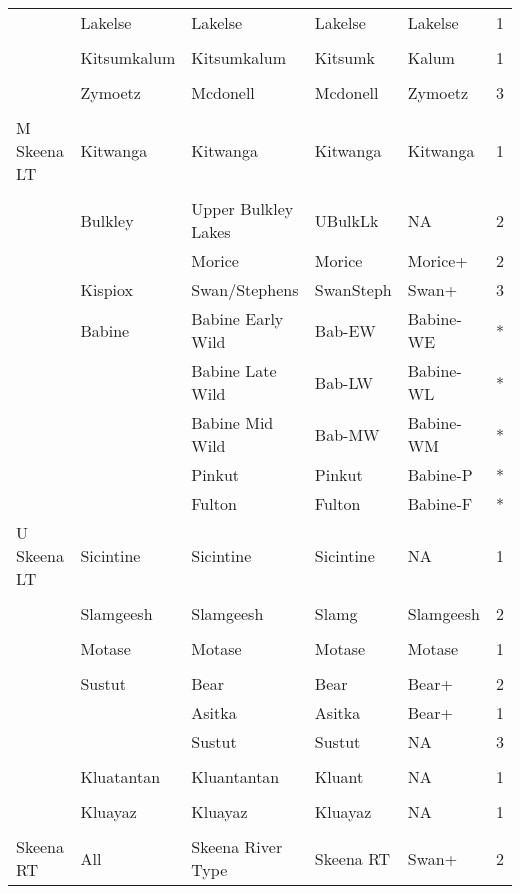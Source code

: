 \documentclass[french,11pt]{book}
\begin{document}
\begin{longtable}[t]{lllllr}
\cmidrule(l){2-6}\\  & Lakelse & Lakelse & Lakelse & Lakelse & 1\\
\cmidrule(l){2-6}\\  & Kitsumkalum & Kitsumkalum & Kitsumk & Kalum & 1\\
\cmidrule(l){2-6}\\  & Zymoetz & Mcdonell & Mcdonell & Zymoetz & 3\\
\midrule\\ M Skeena LT & Kitwanga & Kitwanga & Kitwanga & Kitwanga & 1\\
\cmidrule(l){2-6}\\  & Bulkley & Upper Bulkley Lakes & UBulkLk & NA & 2\\  &  & Morice & Morice & Morice+ & 2\\
\cmidrule(l){2-6}  & Kispiox & Swan/Stephens & SwanSteph & Swan+ & 3\\
\cmidrule(l){2-6}  & Babine & Babine Early Wild & Bab-EW & Babine-WE & *\\  &  & Babine Late Wild & Bab-LW & Babine-WL & *\\  &  & Babine Mid Wild & Bab-MW & Babine-WM & *\\  &  & Pinkut & Pinkut & Babine-P & *\\  &  & Fulton & Fulton & Babine-F & *\\
\midrule U Skeena LT & Sicintine & Sicintine & Sicintine & NA & 1\\
\cmidrule(l){2-6}\\  & Slamgeesh & Slamgeesh & Slamg & Slamgeesh & 2\\
\cmidrule(l){2-6}\\  & Motase & Motase & Motase & Motase & 1\\
\cmidrule(l){2-6}\\  & Sustut & Bear & Bear & Bear+ & 2\\  &  & Asitka & Asitka & Bear+ & 1\\  &  & Sustut & Sustut & NA & 3\\
\cmidrule(l){2-6}\\  & Kluatantan & Kluantantan & Kluant & NA & 1\\
\cmidrule(l){2-6}\\  & Kluayaz & Kluayaz & Kluayaz & NA & 1\\
\midrule\\ Skeena RT & All & Skeena River Type & Skeena RT & Swan+ & 2\\* \end{longtable}
\end{document}
